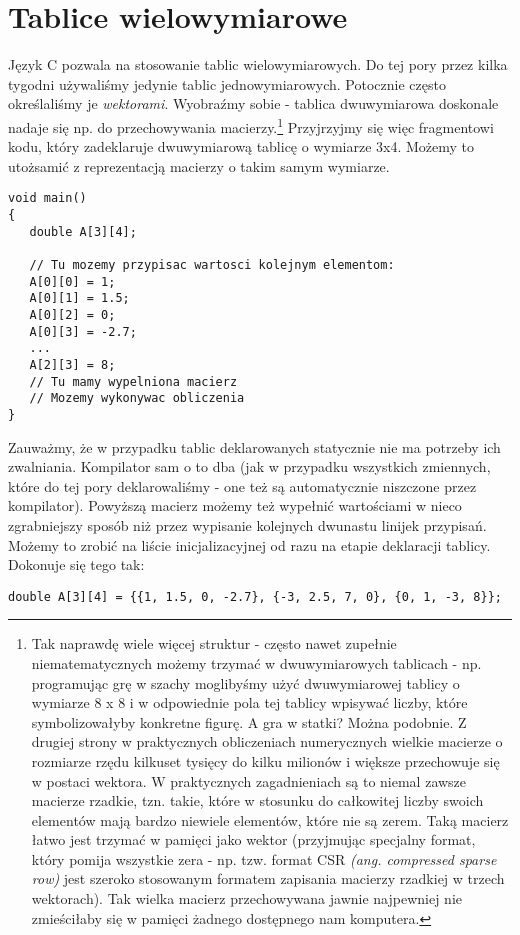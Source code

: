 \documentclass{instrukcja}
\begin{document}
\section*{Tablice wielowymiarowe}
Język C pozwala na stosowanie tablic wielowymiarowych. Do tej pory przez kilka tygodni używaliśmy jedynie tablic jednowymiarowych. Potocznie często określaliśmy je {\it wektorami}. Wyobraźmy sobie - tablica dwuwymiarowa doskonale nadaje się np. do przechowywania macierzy.\footnote{Tak naprawdę wiele więcej struktur - często nawet zupełnie niematematycznych możemy trzymać w dwuwymiarowych tablicach - np. programując grę w szachy moglibyśmy użyć dwuwymiarowej tablicy o wymiarze 8 x 8 i w odpowiednie pola tej tablicy wpisywać liczby, które symbolizowałyby konkretne figurę. A gra w statki? Można podobnie. Z drugiej strony w praktycznych obliczeniach numerycznych wielkie macierze o rozmiarze rzędu kilkuset tysięcy do kilku milionów i większe przechowuje się w postaci wektora. W praktycznych zagadnieniach są to niemal zawsze macierze rzadkie, tzn. takie, które w stosunku do całkowitej liczby swoich elementów mają bardzo niewiele elementów, które nie są zerem. Taką macierz łatwo jest trzymać w pamięci jako wektor (przyjmując specjalny format, który pomija wszystkie zera - np. tzw. format CSR {\it (ang. compressed sparse row)} jest szeroko stosowanym formatem zapisania macierzy rzadkiej w trzech wektorach). Tak wielka macierz przechowywana jawnie najpewniej nie zmieściłaby się w pamięci żadnego dostępnego nam komputera.} Przyjrzyjmy się więc fragmentowi kodu, który zadeklaruje dwuwymiarową tablicę o wymiarze 3x4. Możemy to utożsamić z reprezentacją macierzy o takim samym wymiarze.
\begin{verbatim}
void main()
{
   double A[3][4];
   
   // Tu mozemy przypisac wartosci kolejnym elementom:
   A[0][0] = 1;
   A[0][1] = 1.5;
   A[0][2] = 0;
   A[0][3] = -2.7;
   ...
   A[2][3] = 8;
   // Tu mamy wypelniona macierz
   // Mozemy wykonywac obliczenia
}
\end{verbatim}
Zauważmy, że w przypadku tablic deklarowanych statycznie nie ma potrzeby ich zwalniania. Kompilator sam o to dba (jak w przypadku wszystkich zmiennych, które do tej pory deklarowaliśmy - one też są automatycznie niszczone przez kompilator). Powyższą macierz możemy też wypełnić wartościami w nieco zgrabniejszy sposób niż przez wypisanie kolejnych dwunastu linijek przypisań. Możemy to zrobić na liście inicjalizacyjnej od razu na etapie deklaracji tablicy. Dokonuje się tego tak:
\begin{verbatim}
double A[3][4] = {{1, 1.5, 0, -2.7}, {-3, 2.5, 7, 0}, {0, 1, -3, 8}};
\end{verbatim}
\end{document}
